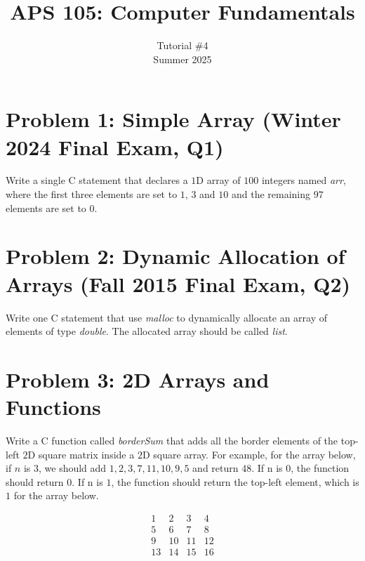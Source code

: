 \documentclass[12pt]{article}
\begin{document}
 
 
\title{APS 105: Computer Fundamentals}
\date{}
\author{Tutorial \#4\\ 
Summer 2025}

\maketitle

\section*{Problem 1: Simple Array (Winter 2024  Final Exam, Q1)}
Write a single C statement that declares a $1$D array of $100$ integers named \textit{arr}, where the first three elements are set to $1$, $3$ and $10$ and the remaining $97$ elements are set to $0$.

\iffalse
\textbf{Example solution:}
\begin{lstlisting}[language=C]
int arr[100] = {1, 3, 10};
\end{lstlisting}
\fi
\section*{Problem 2: Dynamic Allocation of Arrays (Fall 2015 Final Exam, Q2)}
Write one C statement that use \textit{malloc} to dynamically allocate an array of elements of type \textit{double}. The allocated array should be called \textit{list}.
\iffalse
\textbf{Example solution:}
\begin{lstlisting}[language=C]
double *list = (double *)malloc(1000 * sizeof(double));
\end{lstlisting}
\fi
\section*{Problem 3: 2D Arrays and Functions}

Write a C function called \textit{borderSum} that adds all the border elements of the top-left $2$D square matrix inside a $2$D square array. For example, for the array below, if $n$ is $3$, we should add ${1, 2, 3, 7, 11, 10, 9, 5}$ and return 48. If n is 0, the function should return $0$. If n is $1$, the function should return the top-left element, which is $1$ for the array below.

\[
\begin{array}{cccc}
1 & 2 & 3 &4\\
5 & 6 & 7&8\\
9&10&11&12\\
13&14&15&16\\
\end{array}
\]
\end{document}
